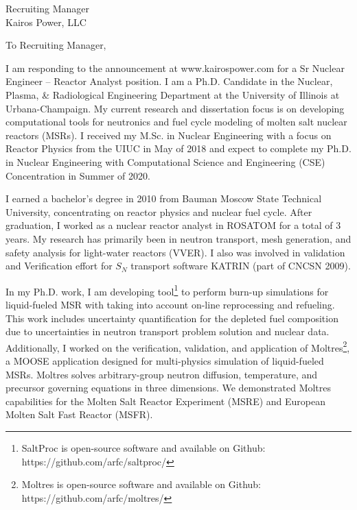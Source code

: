 \documentclass[11pt]{letter} %
\newcommand{\RecipientName}{Recruiting Manager\xspace}
\newcommand{\RecipientAddress}{Kairos Power, LLC}
\begin{document}
\begin{letter}{\RecipientName\\
        \RecipientAddress\xspace}

\address{Andrei Rykhlevskii\\
andreir2@illinois.edu\\
226 Talbot Laboratory\\
104 Wright Street\\
Urbana, IL 61801}


\opening{To \RecipientName,}

I am responding to the announcement at www.kairospower.com for a Sr Nuclear 
Engineer -- Reactor Analyst position. I am a Ph.D. Candidate in the Nuclear, 
Plasma, \& Radiological Engineering Department at the University of Illinois 
at Urbana-Champaign. My current research and dissertation focus is on 
developing computational tools for neutronics and fuel cycle modeling of 
molten salt nuclear reactors (MSRs).  I received my M.Sc. in Nuclear 
Engineering with a focus on Reactor Physics from the UIUC in May of 2018 and 
expect to complete my Ph.D. in Nuclear Engineering with Computational Science 
and Engineering (CSE) Concentration in Summer of 2020.

I earned a bachelor’s degree in 2010 from Bauman Moscow State Technical 
University, concentrating on reactor physics and nuclear fuel cycle. After 
graduation, I worked as a nuclear reactor analyst in ROSATOM for a total of 3 
years. My research has primarily been in neutron transport, mesh generation, 
and safety analysis for light-water reactors (VVER). I also was involved in 
validation and Verification effort for $S_N$ transport software KATRIN (part 
of CNCSN 2009).

In my Ph.D. work, I am developing tool\footnote{SaltProc is open-source 
software and available on Github: https://github.com/arfc/saltproc/} to 
perform burn-up simulations for liquid-fueled MSR with taking into account 
on-line reprocessing and refueling. This work includes uncertainty 
quantification for the depleted fuel composition due to uncertainties in 
neutron transport problem solution and  nuclear data. Additionally, I worked 
on the verification, validation, and application of Moltres\footnote{Moltres 
is open-source software and available on Github: 
https://github.com/arfc/moltres/}, a MOOSE application designed for 
multi-physics simulation of liquid-fueled MSRs. Moltres solves arbitrary-group 
neutron diffusion, temperature, and precursor governing  equations in three 
dimensions. We demonstrated Moltres capabilities for the Molten Salt Reactor 
Experiment (MSRE) and European Molten Salt Fast Reactor (MSFR).


\end{letter}
\end{document}

